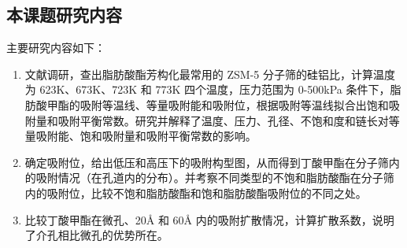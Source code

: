 \subsection{本课题研究内容}
\par{主要研究内容如下}：
\begin{enumerate}
    \item 文献调研，查出脂肪酸酯芳构化最常用的 ZSM-5 分子筛的硅铝比，计算温度为 623K、673K、723K 和 773K 四个温度，压力范围为 0-500kPa 条件下，脂肪酸甲酯的吸附等温线、等量吸附能和吸附位，根据吸附等温线拟合出饱和吸附量和吸附平衡常数。研究并解释了温度、压力、孔径、不饱和度和链长对等量吸附能、饱和吸附量和吸附平衡常数的影响。
    \item 确定吸附位，给出低压和高压下的吸附构型图，从而得到丁酸甲酯在分子筛内的吸附情况（在孔道内的分布）。并考察不同类型的不饱和脂肪酸酯在分子筛内的吸附位，比较不饱和脂肪酸酯和饱和脂肪酸酯吸附位的不同之处。
    \item 比较丁酸甲酯在微孔、20Å 和 60Å 内的吸附扩散情况，计算扩散系数，说明了介孔相比微孔的优势所在。
\end{enumerate}
